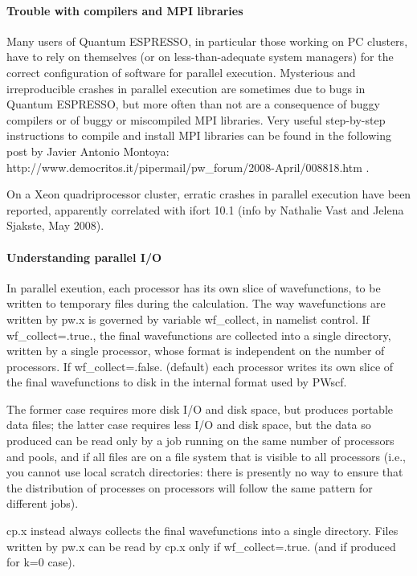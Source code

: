 \documentclass[12pt,a4paper]{article}
\def\qe{{\sc Quantum ESPRESSO}}
\begin{document}
\paragraph{Trouble with compilers and MPI libraries}
Many users of \qe, in particular those working on PC clusters,
have to rely on themselves (or on less-than-adequate system managers) for 
the correct configuration of software for parallel execution. Mysterious and
irreproducible crashes in parallel execution are sometimes due to bugs
in \qe, but more often than not are a consequence of buggy
compilers or of buggy or miscompiled MPI libraries. Very useful step-by-step 
instructions to compile and install MPI libraries
can be found in the following post by Javier Antonio Montoya:\\
http://www.democritos.it/pipermail/pw\_forum/2008-April/008818.htm .

On a Xeon quadriprocessor cluster, erratic crashes in parallel
execution have been reported, apparently correlated with ifort 10.1
(info by Nathalie Vast and Jelena Sjakste, May 2008).

\paragraph{Understanding parallel I/O}
In parallel exeution, each processor has its own slice of wavefunctions, 
to be written to temporary files during the calculation. The way wavefunctions 
are written by pw.x is governed by variable wf\_collect, in namelist control. 
If wf\_collect=.true., the final wavefunctions are collected into a single 
directory, written by a single processor, whose format is independent on 
the number of processors. If wf\_collect=.false. (default) each processor
writes its own slice of the final 
wavefunctions to disk in the internal format used by PWscf. 

The former case requires more
disk I/O and disk space, but produces portable data files; the latter case
requires less I/O and disk space, but the data so produced can be read only
by a job running on the same number of processors and pools, and if
all files are on a file system that is visible to all processors
(i.e., you cannot use local scratch directories: there is presently no
way to ensure that the distribution of processes on processors will
follow the same pattern for different jobs).

cp.x instead always collects the final wavefunctions into a single directory.
Files written by pw.x can be read by cp.x only if wf\_collect=.true. (and if
produced for k=0 case). 
\end{document}
